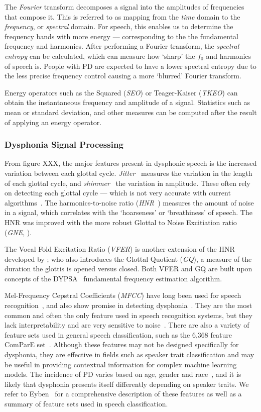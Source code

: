 \documentclass{article}
\begin{document}
The \emph{Fourier} transform decomposes a signal into the amplitudes of frequencies that compose it. This is referred to as mapping from the \textit{time} domain to the \textit{frequency}, or \textit{spectral} domain. For speech, this enables us to determine the frequency bands with more energy --- corresponding to the the fundamental frequency and harmonics. After performing a Fourier transform, the \emph{spectral entropy} can be calculated, which can measure how `sharp' the $f_0$ and harmonics of speech is. People with PD are expected to have a lower spectral entropy due to the less precise frequency control causing a more `blurred' Fourier transform.

Energy operators such as the Squared (\emph{SEO}) or Teager-Kaiser (\emph{TKEO}) \cite{tkeo} can obtain the instantaneous frequency and amplitude of a signal. Statistics such as mean or standard deviation, and other measures can be computed after the result of applying an energy operator.

\subsubsection{Dysphonia Signal Processing}
From figure XXX, the major features present in dysphonic speech is the increased variation between each glottal cycle. \emph{Jitter}~ measures the variation in the length of each glottal cycle, and \emph{shimmer}~\cite{shimmerjitter} the variation in amplitude. These often rely on detecting each glottal cycle --- which is not very accurate with current algorithms~\cite{f0estimation}. The harmonics-to-noise ratio (\emph{HNR}~\citealt{HNRintro}) measures the amount of noise in a signal, which correlates with the `hoarseness' or `breathiness' of speech. The HNR was improved with the more robust Glottal to Noise Excitiation ratio (\emph{GNE}, \citealt{gne}).


The Vocal Fold Excitation Ratio (\emph{VFER}) is another extension of the HNR developed by \citealt{tsanas2011nonlinear}; who also introduces the Glottal Quotient (\emph{GQ}), a measure of the duration the glottis is opened versus closed. Both VFER and GQ are built upon concepts of the DYPSA~\cite{dypsa} fundamental frequency estimation algorithm. 

Mel-Frequency Cepstral Coefficients (\emph{MFCC}) have long been used for speech recognition~\cite{mfcc}, and also show promise in detecting dysphonia~\cite{mfccml}. They are the most common and often the only feature used in speech recognition systems, but they lack interpretability and are very sensitive to noise~\cite{mfccrobust}. There are also a variety of feature sets used in general speech classification, such as the 6,368 feature ComParE set~\cite{is2013}. Although these features may not be designed specifically for dysphonia, they are effective in fields such as speaker trait classification and may be useful in providing contextual information for complex machine learning models. The incidence of PD varies based on age, gender and race~\cite{ageracial,racial}, and it is likely that dysphonia presents itself differently depending on speaker traits. We refer to Eyben~\cite{ostextbook} for a comprehensive description of these features as well as a summary of feature sets used in speech classification.
\end{document}
